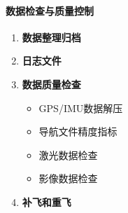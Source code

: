 \paragraph{数据检查与质量控制}
\begin{enumerate}
	\item \textbf{数据整理归档}
	\item \textbf{日志文件}
	\item \textbf{数据质量检查}
		\begin{itemize}
			\item GPS/IMU数据解压
			\item 导航文件精度指标
			\item 激光数据检查
			\item 影像数据检查
		\end{itemize}
	\item \textbf{补飞和重飞}
\end{enumerate}

